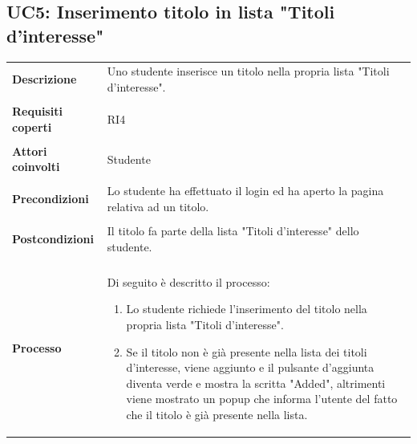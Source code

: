 \documentclass[10pt,a4paper]{report}
\begin{document}
	\subsection{UC5: Inserimento titolo in lista "Titoli d'interesse"}
	\begin{tabular}{lp{}}
		\textbf{Descrizione}&Uno studente inserisce un titolo nella propria lista "Titoli d'interesse".\\
		\\
		\textbf{Requisiti coperti}&RI4\\
		\\
		\textbf{Attori coinvolti}&Studente\\
		\\
		\textbf{Precondizioni}&Lo studente ha effettuato il login ed ha aperto la pagina relativa ad un titolo.\\
		\\
		\textbf{Postcondizioni}&Il titolo fa parte della lista "Titoli d'interesse" dello studente.\\
		\\
		\textbf{Processo}&Di seguito è descritto il processo:
		\begin{enumerate}
			\item Lo studente richiede l'inserimento del titolo nella propria lista "Titoli d'interesse".
			\item Se il titolo non è già presente nella lista dei titoli d'interesse, viene aggiunto e il pulsante d'aggiunta diventa verde e mostra la scritta "Added", altrimenti viene mostrato un popup che informa l'utente del fatto che il titolo è già presente nella lista.
		\end{enumerate}
	\end{tabular}
\end{document}
